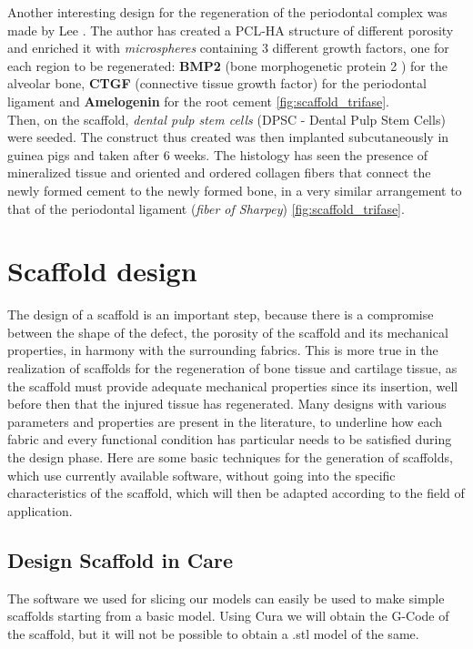 Another interesting design for the regeneration of the periodontal complex was made by Lee \parencite{Reference135}. The author has created a PCL-HA structure of different porosity and enriched it with \emph{microspheres} containing 3 different growth factors, one for each region to be regenerated: \textbf{BMP2} (bone morphogenetic protein 2 ) for the alveolar bone, \textbf{CTGF} (connective tissue growth factor) for the periodontal ligament and \textbf{Amelogenin} for the root cement \ref{fig:scaffold_trifase}. \\
Then, on the scaffold, \emph{dental pulp stem cells} (DPSC - Dental Pulp Stem Cells) were seeded. The construct thus created was then implanted subcutaneously in guinea pigs and taken after 6 weeks. The histology has seen the presence of mineralized tissue and oriented and ordered collagen fibers that connect the newly formed cement to the newly formed bone, in a very similar arrangement to that of the periodontal ligament (\emph{fiber of Sharpey}) \ref{fig:scaffold_trifase}.

\section{Scaffold design}
The design of a scaffold is an important step, because there is a compromise between the shape of the defect, the porosity of the scaffold and its mechanical properties, in harmony with the surrounding fabrics. This is more true in the realization of scaffolds for the regeneration of bone tissue and cartilage tissue, as the scaffold must provide adequate mechanical properties since its insertion, well before then that the injured tissue has regenerated. Many designs with various parameters and properties are present in the literature, to underline how each fabric and every functional condition has particular needs to be satisfied during the design phase.
Here are some basic techniques for the generation of scaffolds, which use currently available software, without going into the specific characteristics of the scaffold, which will then be adapted according to the field of application.

\subsection{Design Scaffold in Care}
The software we used for slicing our models can easily be used to make simple scaffolds starting from a basic model. Using Cura we will obtain the G-Code of the scaffold, but it will not be possible to obtain a .stl model of the same.

